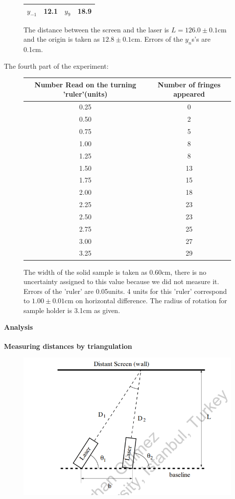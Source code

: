 \documentclass[11pt,a4paper]{article}
\begin{document}
{\begin{center}
\begin{figure} [H]
\begin{tabular}{|c |c||c| c|}
			\hline
			$y_{-1}$&12.1& $y_{9}$&18.9 \\
			\hline
		\end{tabular}
		\caption{The distance between the screen and the laser is $L=126.0\pm0.1$cm and the origin is taken as $12.8\pm0.1$cm. Errors of the $y_n$s's are 0.1cm.}
	\end{figure}
\end{center}
The fourth part of the experiment:
\begin{center}
	\begin{figure} [H] 
		\begin{tabular}{|c |c|} \hline
			Number Read on the turning 'ruler'(units)& Number of fringes appeared \\ [0.5ex] 
			\hline
			0.25&0 \\
			\hline
			0.50 & 2\\
			\hline 
			0.75 &5\\
			\hline 
			1.00&8 \\
			\hline 
			1.25 &8 \\
			\hline 
			1.50 &13\\
			\hline 
			1.75 & 15\\
			\hline
			2.00&18\\
			\hline
			2.25&23 \\
			\hline
			2.50 &23\\
			\hline 
			2.75 &25\\
			\hline 
			3.00&27\\
			\hline 
			3.25 & 29\\
			\hline 	
		\end{tabular}
		\caption{The width of the solid sample is taken as 0.60cm, there is no uncertainty assigned to this value because we did not measure it. Errors of the 'ruler' are 0.05units. 4 units for this 'ruler' correspond to $1.00\pm0.01$cm on horizontal difference. The radius of rotation for sample holder is 3.1cm as given.}
	\end{figure}
\end{center}
\textbf{Analysis}\\[\baselineskip]
\\[\baselineskip]
\textbf{\small{Measuring distances by triangulation}}
\begin{figure}[H]
	\begin{center}
		\includegraphics[scale=0.7]{triang.png}

\end{center}
\end{figure}}
\end{document}
